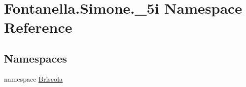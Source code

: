 \hypertarget{namespace_fontanella_1_1_simone_1_1__5i}{}\section{Fontanella.\+Simone.\+\_\+5i Namespace Reference}
\label{namespace_fontanella_1_1_simone_1_1__5i}
\subsection*{Namespaces}
\begin{DoxyCompactItemize}
\item 
namespace \hyperlink{namespace_fontanella_1_1_simone_1_1__5i_1_1_briscola}{Briscola}
\end{DoxyCompactItemize}

